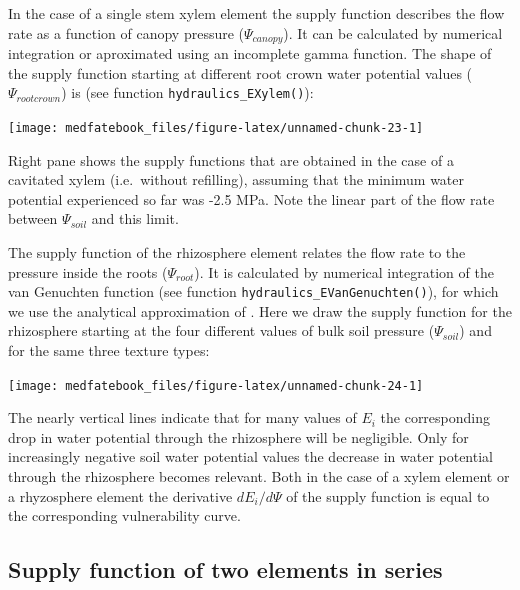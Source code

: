 \documentclass[]{book}
\begin{document}
In the case of a single stem xylem element the supply function describes the flow rate as a function of canopy pressure (\(\Psi_{canopy}\)). It can be calculated by numerical integration or aproximated using an incomplete gamma function. The shape of the supply function starting at different root crown water potential values (\(\Psi_{rootcrown}\)) is (see function \texttt{hydraulics\_EXylem()}):

\begin{center}\texttt{[image: medfatebook\_files/figure-latex/unnamed-chunk-23-1]} \end{center}

Right pane shows the supply functions that are obtained in the case of a cavitated xylem (i.e.~without refilling), assuming that the minimum water potential experienced so far was -2.5 MPa. Note the linear part of the flow rate between \(\Psi_{soil}\) and this limit.

The supply function of the rhizosphere element relates the flow rate to the pressure inside the roots (\(\Psi_{root}\)). It is calculated by numerical integration of the van Genuchten function (see function \texttt{hydraulics\_EVanGenuchten()}), for which we use the analytical approximation of \citet{VanLier2009}. Here we draw the supply function for the rhizosphere starting at the four different values of bulk soil pressure (\(\Psi_{soil}\)) and for the same three texture types:

\begin{center}\texttt{[image: medfatebook\_files/figure-latex/unnamed-chunk-24-1]} \end{center}

The nearly vertical lines indicate that for many values of \(E_i\) the corresponding drop in water potential through the rhizosphere will be negligible. Only for increasingly negative soil water potential values the decrease in water potential through the rhizosphere becomes relevant. Both in the case of a xylem element or a rhyzosphere element the derivative \(dE_i/d\Psi\) of the supply function is equal to the corresponding vulnerability curve.

\hypertarget{supply-function-of-two-elements-in-series}{%
\subsection{Supply function of two elements in series}\label{supply-function-of-two-elements-in-series}}
\end{document}
